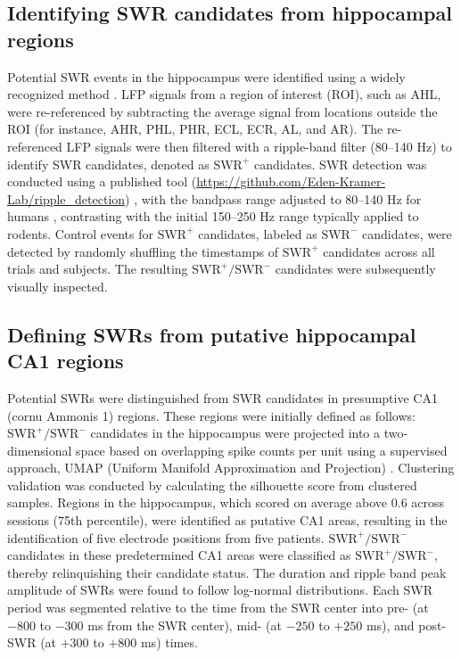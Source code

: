 \subsection{Identifying SWR candidates from hippocampal regions}
Potential SWR events in the hippocampus were identified using a widely recognized method \cite{liu_consensus_2022}. LFP signals from a region of interest (ROI), such as AHL, were re-referenced by subtracting the average signal from locations outside the ROI (for instance, AHR, PHL, PHR, ECL, ECR, AL, and AR). The re-referenced LFP signals were then filtered with a ripple-band filter (80--140 Hz) to identify SWR candidates, denoted as $\textrm{SWR}^+$ candidates. SWR detection was conducted using a published tool (\url{https://github.com/Eden-Kramer-Lab/ripple_detection}) \cite{kay_hippocampal_2016}, with the bandpass range adjusted to 80--140 Hz for humans \cite{norman_hippocampal_2019} \cite{norman_hippocampal_2021}, contrasting with the initial 150--250 Hz range typically applied to rodents. Control events for $\textrm{SWR}^+$ candidates, labeled as $\textrm{SWR}^-$ candidates, were detected by randomly shuffling the timestamps of $\textrm{SWR}^+$ candidates across all trials and subjects. The resulting $\textrm{SWR}^+/\textrm{SWR}^-$ candidates were subsequently visually inspected.

\subsection{Defining SWRs from putative hippocampal CA1 regions}
Potential SWRs were distinguished from SWR candidates in presumptive CA1 (cornu Ammonis 1) regions. These regions were initially defined as follows: $\textrm{SWR}^+/\textrm{SWR}^-$ candidates in the hippocampus were projected into a two-dimensional space based on overlapping spike counts per unit using a supervised approach, UMAP (Uniform Manifold Approximation and Projection) \cite{mcinnes_umap_2018}. Clustering validation was conducted by calculating the silhouette score \cite{rousseeuw_silhouettes_1987} from clustered samples. Regions in the hippocampus, which scored on average above 0.6 across sessions (75th percentile), were identified as putative CA1 areas, resulting in the identification of five electrode positions from five patients. $\textrm{SWR}^+/\textrm{SWR}^-$ candidates in these predetermined CA1 areas were classified as $\textrm{SWR}^+/\textrm{SWR}^-$, thereby relinquishing their candidate status. The duration and ripple band peak amplitude of SWRs were found to follow log-normal distributions. Each SWR period was segmented relative to the time from the SWR center into pre- (at $-800$ to $-300$ ms from the SWR center), mid- (at $-250$ to $+250$ ms), and post-SWR (at $+300$ to $+800$ ms) times.

